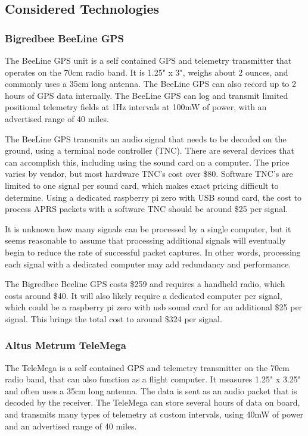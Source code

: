 \documentclass[onecolumn, draftclsnofoot, 10pt, compsoc]{IEEEtran}
\begin{document}
\subsection{Considered Technologies}

\subsubsection{Bigredbee BeeLine GPS}
The BeeLine GPS unit is a self contained GPS and telemetry transmitter that operates on the 70cm radio band.  It is 1.25" x 3", weighs about 2 ounces, and commonly uses a 35cm long antenna.  The BeeLine GPS can also record up to 2 hours of GPS data internally.  The BeeLine GPS can log and transmit limited positional telemetry fields at 1Hz intervals at 100mW of power, with an advertised range of 40 miles.\cite{8}

The BeeLine GPS transmits an audio signal that needs to be decoded on the ground, using a terminal node controller (TNC).  There are several devices that can accomplish this, including using the sound card on a computer.  The price varies by vendor, but most hardware TNC's cost over \$80.\cite{2}  Software TNC's are limited to one signal per sound card, which makes exact pricing difficult to determine.  Using a dedicated raspberry pi zero with USB sound card, the cost to process APRS packets with a software TNC should be around \$25 per signal.\cite{3}

It is unknown how many signals can be processed by a single computer, but it seems reasonable to assume that processing additional signals will eventually begin to reduce the rate of successful packet captures.  In other words, processing each signal with a dedicated computer may add redundancy and performance.

The Bigredbee Beeline GPS costs \$259 and requires a handheld radio, which costs around \$40.  It will also likely require a dedicated computer per signal, which could be a raspberry pi zero with usb sound card for an additional \$25 per signal.  This brings the total cost to around \$324 per signal.

\subsubsection{Altus Metrum TeleMega}
The TeleMega is a self contained GPS and telemetry transmitter on the 70cm radio band, that can also function as a flight computer.  It measures 1.25" x 3.25" and often uses a 35cm long antenna. The data is sent as an audio packet that is decoded by the receiver.  The TeleMega can store several hours of data on board, and transmits many types of telemetry at custom intervals, using 40mW of power and an advertised range of 40 miles.\cite{9}
\end{document}
